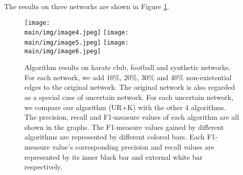 \documentclass[\main/thesis.tex]{subfiles}
\begin{document}


The results on three networks are shown in Figure \ref{supervised-result-local}.

\begin{figure}
\texttt{[image: \\main/img/image4.jpeg]}
\centering
\texttt{[image: \\main/img/image5.jpeg]}
\centering
\texttt{[image: \\main/img/image6.jpeg]}
\caption{Algorithm results on karate club, football and synthetic networks. For each network, we add 10\%, 20\%, 30\% and 40\% non-existential edges to the original network. The original network is also regarded as a special case of uncertain network. For each uncertain network, we compare our algorithm (UR+K) with the other 4 algorithms. The precision, recall and F1-measure values of each algorithm are all shown in the graphs. The F1-measure values gained by different algorithms are represented by different colored bars. Each F1-measure value's corresponding precision and recall values are represented by its inner black bar and external white bar respectively.}
\label{supervised-result-local}
\end{figure}

\end{document}
